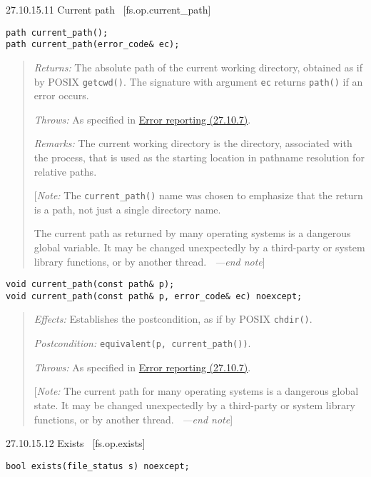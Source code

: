 27.10.15.11 Current path~ {[}fs.op.current\_path{]}

\begin{verbatim}
path current_path();
path current_path(error_code& ec);
\end{verbatim}

\begin{quote}
\emph{Returns:} The absolute path of the current working directory,
obtained as if by POSIX \texttt{getcwd()}. The signature with argument
\texttt{ec} returns \texttt{path()} if an error occurs.

\emph{Throws:} As specified in \hyperref[Error-reporting]{Error
reporting (27.10.7)}.

\emph{Remarks:} The current working directory is the directory,
associated with the process, that is used as the starting location in
pathname resolution for relative paths.

{[}\emph{Note:} The \texttt{current\_path()} name was chosen to
emphasize that the return is a path, not just a single directory name.

The current path as returned by many operating systems is a dangerous
global variable. It may be changed unexpectedly by a third-party or
system library functions, or by another thread.~ \emph{---end note}{]}
\end{quote}

\begin{verbatim}
void current_path(const path& p);
void current_path(const path& p, error_code& ec) noexcept;
\end{verbatim}

\begin{quote}
\emph{Effects:} Establishes the postcondition, as if by POSIX
\texttt{chdir()}.

\emph{Postcondition:} \texttt{equivalent(p,\ current\_path())}.

\emph{Throws:} As specified in \hyperref[Error-reporting]{Error
reporting (27.10.7)}.

{[}\emph{Note:} The current path for many operating systems is a
dangerous global state. It may be changed unexpectedly by a third-party
or system library functions, or by another thread.~ \emph{---end
note}{]}
\end{quote}

27.10.15.12 Exists~ {[}fs.op.exists{]}

\begin{verbatim}
bool exists(file_status s) noexcept;
\end{verbatim}

